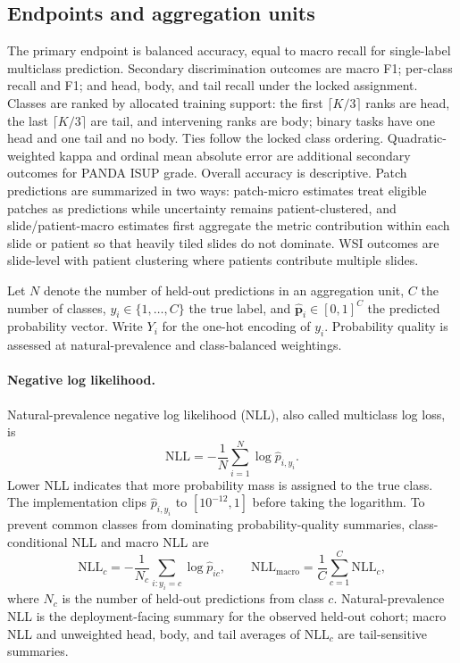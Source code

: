 \documentclass[11pt]{article}
\begin{document}
\subsection{Endpoints and aggregation units}
The primary endpoint is balanced accuracy, equal to macro recall for single-label multiclass prediction. Secondary discrimination outcomes are macro F1; per-class recall and F1; and head, body, and tail recall under the locked assignment. Classes are ranked by allocated training support: the first $\lceil K/3\rceil$ ranks are head, the last $\lceil K/3\rceil$ are tail, and intervening ranks are body; binary tasks have one head and one tail and no body. Ties follow the locked class ordering. Quadratic-weighted kappa and ordinal mean absolute error are additional secondary outcomes for PANDA ISUP grade. Overall accuracy is descriptive. Patch predictions are summarized in two ways: patch-micro estimates treat eligible patches as predictions while uncertainty remains patient-clustered, and slide/patient-macro estimates first aggregate the metric contribution within each slide or patient so that heavily tiled slides do not dominate. WSI outcomes are slide-level with patient clustering where patients contribute multiple slides.

Let $N$ denote the number of held-out predictions in an aggregation unit, $C$ the number of classes, $y_i\in\{1,\ldots,C\}$ the true label, and $\hat{\mathbf{p}}_i\in[0,1]^C$ the predicted probability vector. Write $Y_i$ for the one-hot encoding of $y_i$. Probability quality is assessed at natural-prevalence and class-balanced weightings.

\paragraph{Negative log likelihood.}
Natural-prevalence negative log likelihood (NLL), also called multiclass log loss, is
\begin{equation}
  \mathrm{NLL}=-\frac{1}{N}\sum_{i=1}^{N}\log \hat{p}_{i,y_i}.
  \label{eq:nll}
\end{equation}
\noindent Lower NLL indicates that more probability mass is assigned to the true class. The implementation clips $\hat{p}_{i,y_i}$ to $[10^{-12},1]$ before taking the logarithm. To prevent common classes from dominating probability-quality summaries, class-conditional NLL and macro NLL are
\begin{equation}
  \mathrm{NLL}_c=-\frac{1}{N_c}\sum_{i:y_i=c}\log \hat{p}_{ic},
  \qquad
  \mathrm{NLL}_{\mathrm{macro}}=\frac{1}{C}\sum_{c=1}^{C}\mathrm{NLL}_c,
  \label{eq:macro-nll}
\end{equation}
\noindent where $N_c$ is the number of held-out predictions from class $c$. Natural-prevalence NLL is the deployment-facing summary for the observed held-out cohort; macro NLL and unweighted head, body, and tail averages of $\mathrm{NLL}_c$ are tail-sensitive summaries.
\end{document}
